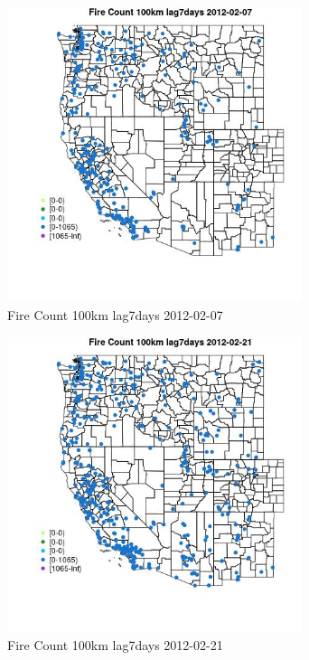 \begin{figure} 
\centering  
\includegraphics[width=0.77\textwidth]{Code_Outputs/Report_ML_input_PM25_Step4_part_f_de_duplicated_aveswNAs_MapObsFire_Count_100km_lag7days2012-02-07.jpg} 
\caption{\label{fig:Report_ML_input_PM25_Step4_part_f_de_duplicated_aveswNAsMapObsFire_Count_100km_lag7days2012-02-07}Fire Count 100km lag7days 2012-02-07} 
\end{figure} 
 

\begin{figure} 
\centering  
\includegraphics[width=0.77\textwidth]{Code_Outputs/Report_ML_input_PM25_Step4_part_f_de_duplicated_aveswNAs_MapObsFire_Count_100km_lag7days2012-02-21.jpg} 
\caption{\label{fig:Report_ML_input_PM25_Step4_part_f_de_duplicated_aveswNAsMapObsFire_Count_100km_lag7days2012-02-21}Fire Count 100km lag7days 2012-02-21} 
\end{figure} 
 

